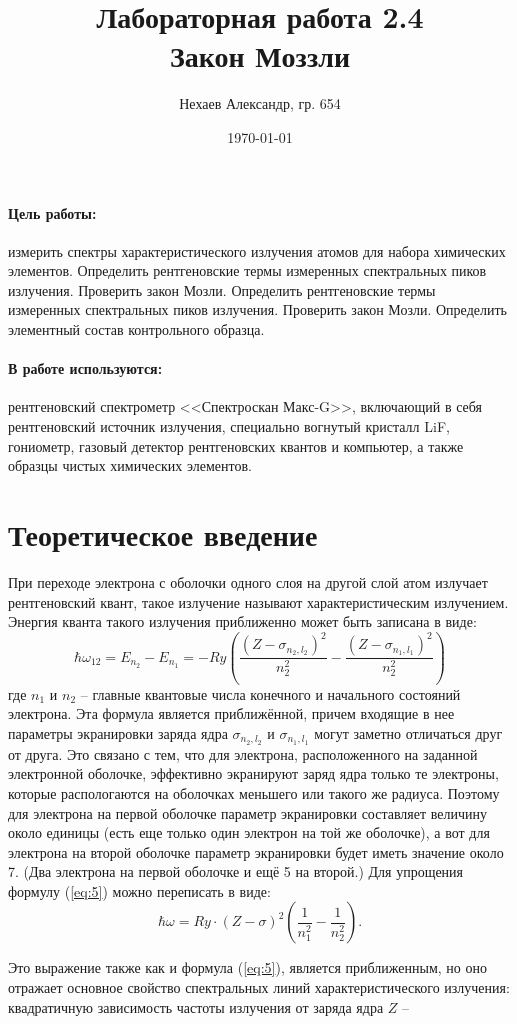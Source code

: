 \documentclass[a4paper, 12pt]{article}
\title{Лабораторная работа 2.4\\Закон Моззли}
\author{Нехаев Александр, гр. 654}
\date{\today}
\begin{document}
\maketitle
\tableofcontents
\paragraph{Цель работы:}
измерить спектры характеристического излучения атомов для набора химических элементов. Определить рентгеновские термы измеренных спектральных пиков излучения. Проверить закон Мозли. Определить рентгеновские термы измеренных спектральных пиков излучения. Проверить закон Мозли. Определить элементный состав контрольного образца.
\paragraph{В работе используются:}
рентгеновский спектрометр <<Спектроскан Макс-G>>, включающий в себя рентгеновский источник излучения, специально вогнутый кристалл LiF, гониометр, газовый детектор рентгеновских квантов и компьютер, а также образцы чистых химических элементов.
\section{Теоретическое введение}
При переходе электрона с оболочки одного слоя на другой слой атом излучает рентгеновский квант, такое излучение называют характеристическим излучением. Энергия кванта такого излучения приближенно может быть записана в виде:
\begin{equation}
	\hbar\omega_{12}=E_{n_2}-E_{n_1}=-Ry\left(\frac{(Z-\sigma_{n_2,l_2})^2}{n_2^2}-\frac{(Z-\sigma_{n_1,l_1})^2}{n_2^2}\right)
	\label{eq:5}
\end{equation}
где $n_1$ и $n_2$ -- главные квантовые числа конечного и начального состояний электрона. Эта формула является приближённой, причем входящие в нее параметры экранировки заряда ядра $\sigma_{n_2,l_2}$ и $\sigma_{n_1,l_1}$ могут заметно отличаться друг от друга. Это связано с тем, что для электрона, расположенного на заданной электронной оболочке, эффективно экранируют заряд ядра только те электроны, которые распологаются на оболочках меньшего или такого же радиуса. Поэтому для электрона на первой оболочке параметр экранировки составляет величину около единицы (есть еще только один электрон на той же оболочке), а вот для электрона на второй оболочке параметр экранировки будет иметь значение около 7. (Два электрона на первой оболочке и ещё 5 на второй.) Для упрощения формулу (\ref{eq:5}) можно переписать в виде:
\begin{equation}
	\hbar\omega=Ry\cdot\left(Z-\sigma\right)^2\left(\frac{1}{n_1^2}-\frac{1}{n_2^2}\right).
\end{equation}
\par
Это выражение также как и формула (\ref{eq:5}), является приближенным, но оно отражает основное свойство спектральных линий характеристического излучения: квадратичную зависимость частоты излучения от заряда ядра $Z$ -- 
\end{document}

